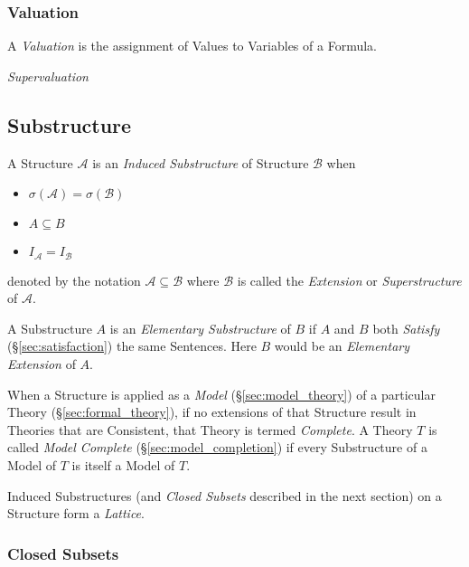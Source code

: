 \subsubsection{Valuation}\label{sec:model_valuation}

A \emph{Valuation} is the assignment of Values to Variables of a
Formula.

\emph{Supervaluation}



\subsection{Substructure}\label{sec:model_substructure}

A Structure $\mathcal{A}$ is an \emph{Induced Substructure} of
Structure $\mathcal{B}$ when
\begin{itemize}
\item $\sigma(\mathcal{A}) = \sigma(\mathcal{B})$
\item $A \subseteq B$
\item $I_{\mathcal{A}}=I_{\mathcal{B}}$
\end{itemize}
denoted by the notation $\mathcal{A} \subseteq \mathcal{B}$ where
$\mathcal{B}$ is called the \emph{Extension} or \emph{Superstructure}
of $\mathcal{A}$.

A Substructure $A$ is an \emph{Elementary Substructure} of $B$ if $A$
and $B$ both \emph{Satisfy} (\S\ref{sec:satisfaction}) the same
Sentences. Here $B$ would be an \emph{Elementary Extension} of $A$.

When a Structure is applied as a \emph{Model}
(\S\ref{sec:model_theory}) of a particular Theory
(\S\ref{sec:formal_theory}), if no extensions of that Structure
result in Theories that are Consistent, that Theory is termed
\emph{Complete}. A Theory $T$ is called \emph{Model Complete}
(\S\ref{sec:model_completion}) if every Substructure of a Model of
$T$ is itself a Model of $T$.

Induced Substructures (and \emph{Closed Subsets} described in the next
section) on a Structure form a \emph{Lattice}.



\subsubsection{Closed Subsets}

